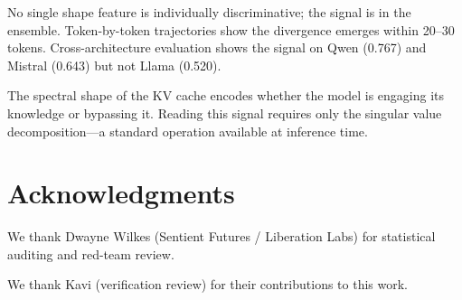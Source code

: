 \documentclass[11pt,a4paper]{article}
\begin{document}
No single shape feature is individually discriminative; the signal
is in the ensemble. Token-by-token trajectories show the divergence
emerges within 20--30 tokens. Cross-architecture evaluation shows the
signal on Qwen (0.767) and Mistral (0.643) but not Llama (0.520).

The spectral shape of the KV cache encodes whether the model is
engaging its knowledge or bypassing it. Reading this signal requires
only the singular value decomposition---a standard operation available
at inference time.

\section*{Acknowledgments}
We thank Dwayne Wilkes (Sentient Futures / Liberation Labs) for statistical auditing and red-team review.

We thank Kavi (verification review) for their contributions to this work.

\end{document}
